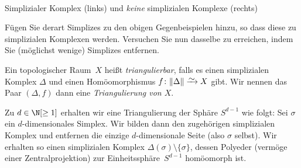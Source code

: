 \begin{center}
    \\
    \footnotesize
    Simplizialer Komplex (links) und 
    \emph{keine} simplizialen Komplexe (rechts)
\end{center}

\begin{thAufgabe}
    Fügen Sie derart Simplizes zu den obigen Gegenbeispielen hinzu, so dass
    diese zu simplizialen Komplexen werden. Versuchen Sie nun dasselbe zu
    erreichen, indem Sie (möglichst wenige) Simplizes entfernen.
\end{thAufgabe}

\begin{thDef}
    Ein topologischer Raum~$X$ heißt \emph{triangulierbar}, falls es
    einen simplizialen Komplex $\Delta$ und einen Homöomorphismus
    $f\colon\polyeder\Delta \isorightarrow X$ gibt. Wir nennen das 
    Paar $(\Delta,f)$ dann eine \emph{Triangulierung von $X$}.
\end{thDef}

\begin{thBeispiel}\label{gsc:bsp:spheretriang}
    Zu $d\in\N[\geq1]$ erhalten wir eine Triangulierung der Sphäre
    $S^{d-1}$ wie folgt: Sei $\sigma$ ein $d$-dimensionales Simplex. Wir bilden
    dann den zugehörigen simplizialen Komplex und entfernen die einzige
    $d$-dimensionale Seite (also $\sigma$ selbst). Wir erhalten so einen
    simplizialen Komplex $\Delta(\sigma)\setminus\{\sigma\}$, dessen Polyeder
    (vermöge einer Zentralprojektion) zur Einheitssphäre~$S^{d-1}$ homöomorph ist. 
\end{thBeispiel}


